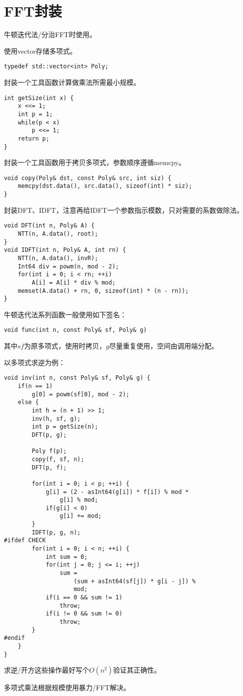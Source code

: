 \section{FFT封装}
牛顿迭代法/分治FFT时使用。

使用vector存储多项式。
\begin{lstlisting}
typedef std::vector<int> Poly;
\end{lstlisting}

封装一个工具函数计算做乘法所需最小规模。
\begin{lstlisting}
int getSize(int x) {
    x <<= 1;
    int p = 1;
    while(p < x)
        p <<= 1;
    return p;
}
\end{lstlisting}

封装一个工具函数用于拷贝多项式，参数顺序遵循memcpy。
\begin{lstlisting}
void copy(Poly& dst, const Poly& src, int siz) {
    memcpy(dst.data(), src.data(), sizeof(int) * siz);
}
\end{lstlisting}

封装DFT、IDFT，注意再给IDFT一个参数指示模数，只对需要的系数做除法。
\begin{lstlisting}
void DFT(int n, Poly& A) {
    NTT(n, A.data(), root);
}
void IDFT(int n, Poly& A, int rn) {
    NTT(n, A.data(), invR);
    Int64 div = powm(n, mod - 2);
    for(int i = 0; i < rn; ++i)
        A[i] = A[i] * div % mod;
    memset(A.data() + rn, 0, sizeof(int) * (n - rn));
}
\end{lstlisting}

牛顿迭代法系列函数一般使用如下签名：
\begin{lstlisting}
void func(int n, const Poly& sf, Poly& g)
\end{lstlisting}
其中$sf$为原多项式，使用时拷贝，$g$尽量重复使用，空间由调用端分配。

以多项式求逆为例：
\begin{lstlisting}
void inv(int n, const Poly& sf, Poly& g) {
    if(n == 1)
        g[0] = powm(sf[0], mod - 2);
    else {
        int h = (n + 1) >> 1;
        inv(h, sf, g);
        int p = getSize(n);
        DFT(p, g);

        Poly f(p);
        copy(f, sf, n);
        DFT(p, f);

        for(int i = 0; i < p; ++i) {
            g[i] = (2 - asInt64(g[i]) * f[i]) % mod *
                g[i] % mod;
            if(g[i] < 0)
                g[i] += mod;
        }
        IDFT(p, g, n);
#ifdef CHECK
        for(int i = 0; i < n; ++i) {
            int sum = 0;
            for(int j = 0; j <= i; ++j)
                sum =
                    (sum + asInt64(sf[j]) * g[i - j]) %
                    mod;
            if(i == 0 && sum != 1)
                throw;
            if(i != 0 && sum != 0)
                throw;
        }
#endif
    }
}
\end{lstlisting}

求逆/开方这些操作最好写个$O(n^2)$验证其正确性。

多项式乘法根据规模使用暴力/FFT解决。
